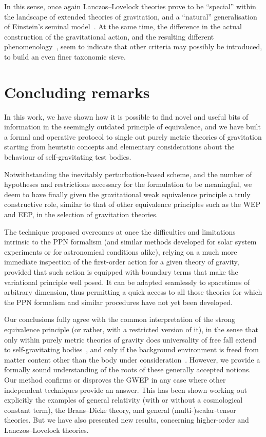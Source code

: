 \documentclass[a4paper,showkeys,aps,prd,reprint,nofootinbib,showpacs,twocolumn]{revtex4-1}
\theoremstyle{plain}
\begin{document}
In this sense, once again Lanczos--Lovelock theories prove to be ``special'' within the landscape of extended theories of gravitation, and a ``natural'' generalisation of Einstein's seminal model~\cite{Mukhopadhyay:2006vu, Padmanabhan:2010zzb}. At the same time, the difference in the actual construction of the gravitational action, and the resulting different phenomenology~\cite{Choquet-Bruhat:2009xil, Golod:2012yt}, seem to indicate that other criteria may possibly be introduced, to build an even finer taxonomic sieve.


\section{Concluding remarks}
\label{S:7}

In this work, we have shown how it is possible to find novel and useful bits of information in the seemingly outdated principle of equivalence, and we have built a formal and operative protocol to single out purely metric theories of gravitation starting from heuristic concepts and elementary considerations about the behaviour of self-gravitating test bodies.

Notwithstanding the inevitably perturbation-based scheme, and the number of hypotheses and restrictions necessary for the formulation to be meaningful, we deem to have finally given the gravitational weak equivalence principle a truly constructive role, similar to that of other equivalence principles such as the WEP and EEP, in the selection of gravitation theories.

The technique proposed overcomes at once the difficulties and limitations intrinsic to the PPN formalism (and similar methods developed for solar system experiments or for astronomical conditions alike), relying on a much more immediate inspection of the first-order action for a given theory of gravity, provided that such action is equipped with boundary terms that make the variational principle well posed.  It can be adapted seamlessly to spacetimes of arbitrary dimension, thus permitting a quick access to all those theories for which the PPN formalism and similar procedures have not yet been developed.

Our conclusions fully agree with the common interpretation of the strong equivalence principle (or rather, with a restricted version of it), in the sense that only within purely metric theories of gravity does universality of free fall extend to self-gravitating bodies~\cite{will}, and only if the background environment is freed from matter content other than the body under consideration~\cite{Mino}.  However, we provide a formally sound understanding of the roots of these generally accepted notions.  Our method confirms or disproves the GWEP in any case where other independent techniques provide an answer. This has been shown working out explicitly the examples of general relativity (with or without a cosmological constant term), the Brans--Dicke theory, and general (multi-)scalar-tensor theories.  But we have also presented new results, concerning higher-order and Lanczos--Lovelock theories.
\end{document}
